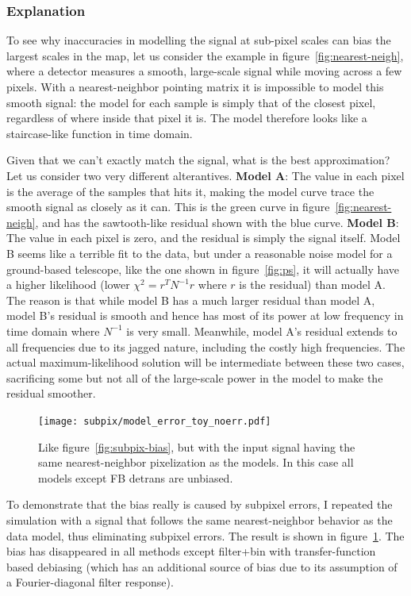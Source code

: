 \documentclass[twocolumn,apj]{aastex63}
\newcommand{\dfn}[1]{\textbf{#1}}
\begin{document}
\subsubsection{Explanation}
To see why inaccuracies in modelling the signal at sub-pixel scales can bias
the largest scales in the map, let us consider the example in figure~\ref{fig:nearest-neigh},
where a detector measures a smooth, large-scale signal while moving across a few
pixels. With a nearest-neighbor pointing matrix it is impossible to model this
smooth signal: the model for each sample is simply that of the closest pixel,
regardless of where inside that pixel it is. The model therefore looks like
a staircase-like function in time domain.

Given that we can't exactly match the signal, what is the best approximation?
Let us consider two very different alterantives. \dfn{Model A}: The value in each pixel
is the average of the samples that hits it, making the model curve trace the
smooth signal as closely as it can. This is the green curve in figure~\ref{fig:nearest-neigh},
and has the sawtooth-like residual shown with the blue curve.
\dfn{Model B}: The value in each pixel is zero, and the residual is simply the signal itself.
Model B seems like a terrible fit to the data, but under a reasonable noise model
for a ground-based telescope, like the one shown in figure~\ref{fig:ps}, it
will actually have a higher likelihood (lower $\chi^2 = r^TN^{-1}r$
where $r$ is the residual) than model A. The reason is that while model B has a much
larger residual than model A, model B's residual is smooth and hence has most of its
power at low frequency in time domain where $N^{-1}$ is very small. Meanwhile, model A's
residual extends to all frequencies due to its jagged nature, including the costly high
frequencies. The actual maximum-likelihood solution will be intermediate between these
two cases, sacrificing some but not all of the large-scale power in the model to make
the residual smoother.

\begin{figure}
	\centering
	\texttt{[image: subpix/model\_error\_toy\_noerr.pdf]}
	\caption{
		Like figure~\ref{fig:subpix-bias}, but with the input signal
		having the same nearest-neighbor pixelization as the models.
		In this case all models except FB detrans are unbiased.
	}
	\label{fig:subpix-noerr}
\end{figure}

To demonstrate that the bias really is caused by subpixel errors,
I repeated the simulation with a signal that follows the same nearest-neighbor
behavior as the data model, thus eliminating subpixel errors. The
result is shown in figure~\ref{fig:subpix-noerr}. The bias has disappeared
in all methods except filter+bin with transfer-function based debiasing
(which has an additional source of bias due to its assumption of a Fourier-diagonal
filter response).
\end{document}
